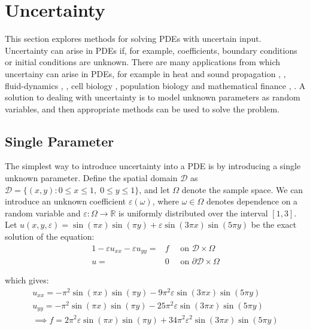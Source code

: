 \documentclass[11pt]{article}
\numberwithin{equation}{section}
\begin{document}
\newpage

\section{Uncertainty}
This section explores methods for solving PDEs with uncertain input. Uncertainty can arise in PDEs if, for example, coefficients, boundary conditions or initial conditions are unknown. There are many applications from which uncertainy can arise in PDEs, for example in heat and sound propagation \cite{Swanson}, \cite{Pryhara}, fluid-dynamics \cite{Breit}, \cite{Holm}, cell biology \cite{Bressloff}, population biology \cite{Edwards} and mathematical finance \cite{Shreve03}, \cite{Shreve04}. A solution to dealing with uncertainty is to model unknown parameters as random variables, and then appropriate methods can be used to solve the problem. 

\subsection{Single Parameter}
The simplest way to introduce uncertainty into a PDE is by introducing a single unknown parameter. Define the spatial domain $\mathcal{D}$ as $\mathcal{D} = \{(x,y) : 0 \leq x \leq 1, \; 0 \leq y \leq 1 \}$, and let $\Omega$ denote the sample space. We can introduce an unknown coefficient $\varepsilon(\omega)$, where $\omega \in \Omega$ denotes dependence on a random variable and $\varepsilon: \Omega \rightarrow \mathbb{R}$ is uniformly distributed over the interval $[1,3]$. Let $u(x,y,\varepsilon) = \sin(\pi x)\sin(\pi y) + \varepsilon \sin(3 \pi x) \sin(5 \pi y)$ be the exact solution of the equation:
\begin{alignat}{1}
-\varepsilon u_{xx} -\varepsilon u_{yy} = {}& f \quad \text{ on } \mathcal{D} \times \Omega \nonumber \\
u = {}& 0 \quad \text{ on } \partial \mathcal{D} \times \Omega
\end{alignat}

which gives:
\begin{equation}
\begin{split}
u_{xx} = -\pi^2 \sin(\pi x) \sin(\pi y) - 9\pi^2 \varepsilon \sin(3\pi x) \sin(5\pi y) \\
u_{yy} = -\pi^2 \sin(\pi x) \sin(\pi y) - 25\pi^2 \varepsilon \sin(3\pi x) \sin(5\pi y) \\
\implies f = 2\pi^2 \varepsilon \sin(\pi x) \sin(\pi y) + 34\pi^2 \varepsilon^2 \sin(3\pi x) \sin(5\pi y)
\end{split}
\end{equation}
\end{document}
